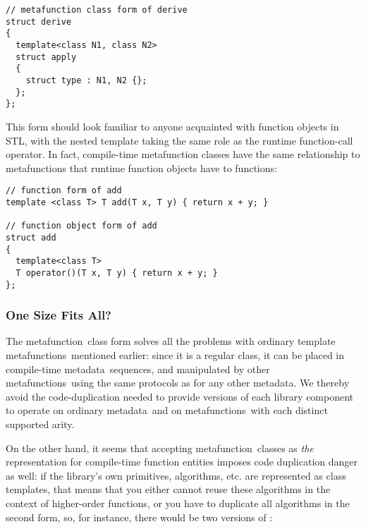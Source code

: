 \documentclass{kapproc}
\newcommand{\mfn}{meta\-func\-tion}
\newcommand{\mfns}{meta\-func\-tions}
\newcommand{\mdat}{meta\-data}
\begin{document}
{\small
\begin{codesamp}\begin{verbatim}
// metafunction class form of derive
struct derive
{
  template<class N1, class N2>
  struct apply
  {
    struct type : N1, N2 {};
  };
};
\end{verbatim}
\end{codesamp}
}

This form should look familiar to anyone acquainted with function
objects in STL, with the nested  template taking the same
role as the runtime function-call operator. In fact, compile-time
metafunction classes have the same relationship to metafunctions that
runtime function objects have to functions:

{\small
\begin{codesamp}\begin{verbatim}
// function form of add
template <class T> T add(T x, T y) { return x + y; }

// function object form of add
struct add
{
  template<class T>
  T operator()(T x, T y) { return x + y; }
};
\end{verbatim}
\end{codesamp}
}


\subsubsection{One Size Fits All?}

The \mfn\ class form solves all the problems with ordinary template
\mfns\ mentioned earlier: since it is a regular class, it can be
placed in compile-time \mdat\ sequences, and manipulated by other
\mfns\ using the same protocols as for any other \mdat. We thereby
avoid the code-duplication needed to provide versions of each library
component to operate on ordinary \mdat\ and on \mfns\ with each
distinct supported arity.

On the other hand, it seems that accepting \mfn\ classes as \emph{the}
representation for compile-time function entities imposes code
duplication danger as well: if the library's own primitives,
algorithms, etc. are represented as class templates, that means that
you either cannot reuse these algorithms in the context of
higher-order functions, or you have to duplicate all algorithms in the
second form, so, for instance, there would be two versions of
:
\end{document}
